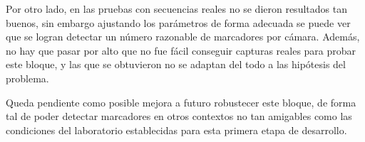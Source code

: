 Por otro lado, en las pruebas con secuencias reales no se dieron resultados tan buenos, sin embargo ajustando los parámetros de forma adecuada se puede ver que se logran detectar un número razonable de marcadores por cámara. Además, no hay que pasar por alto que no fue fácil conseguir capturas reales para probar este bloque, y las que se obtuvieron no se adaptan del todo a las hipótesis del problema.

 Queda pendiente como posible mejora a futuro robustecer este bloque, de forma tal de poder detectar marcadores en otros contextos no tan amigables como las condiciones del laboratorio establecidas para esta primera etapa de desarrollo.